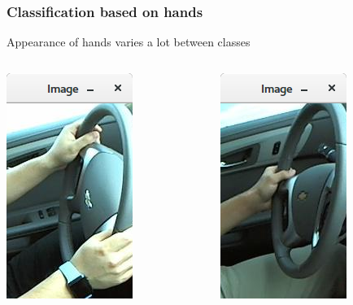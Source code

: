 \documentclass{beamer}
\begin{document}
	\begin{frame}
		\frametitle{Classification based on hands}
		Appearance of hands varies a lot between classes
		\begin{columns}
			\begin{column}{0.5\textwidth}
				\begin{center}			
					\includegraphics[height=0.5\textheight]{handpose_example3}\\			
				\end{center}
			\end{column}
			\begin{column}{0.5\textwidth}
				\begin{center}			
					\includegraphics[height=0.5\textheight]{handpose_example4}\\			
				\end{center}
			\end{column}
		\end{columns}		
	\end{frame}
	
\end{document}
